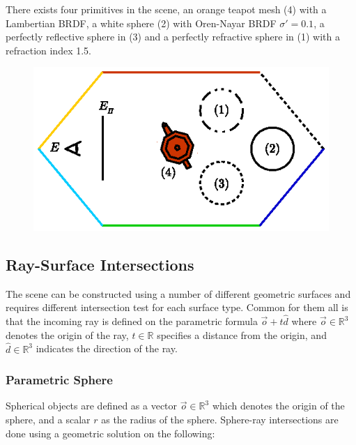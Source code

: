 \documentclass[a4paper, twocolumn]{article}
\begin{document}
        There exists four primitives in the scene, an orange teapot mesh (4) with a Lambertian BRDF, a white sphere (2) with Oren-Nayar BRDF \(\sigma' = 0.1\), a perfectly reflective sphere in (3) and a perfectly refractive sphere in (1) with a refraction index 1.5.

        \begin{figure}[ht]
            \centering
            \includegraphics[width=0.8\linewidth]{share/scene_description.eps}
            \label{fig:scene_description}
        \end{figure}

        \vspace{-1.5em}

        \clearpage

        \subsection{Ray-Surface Intersections} \label{sec:ray-surface_intersections}

        The scene can be constructed using a number of different geometric surfaces and requires different intersection test for each surface type. Common for them all is that the incoming ray is defined on the parametric formula \( \vec{o} + t \hat{d} \) where \( \vec{o} \in \mathbb{R}^3\) denotes the origin of the ray, \(t \in \mathbb{R}\) specifies a distance from the origin, and \(\hat{d} \in \mathbb{R}^3\) indicates the direction of the ray.
            
        \subsubsection{Parametric Sphere} \label{sec:parametric_sphere}
        
        Spherical objects are defined as a vector \(\vec{o} \in \mathbb{R}^3\) which denotes the origin of the sphere, and a scalar \(r\) as the radius of the sphere. Sphere-ray intersections are done using a geometric solution on the following:
\end{document}
